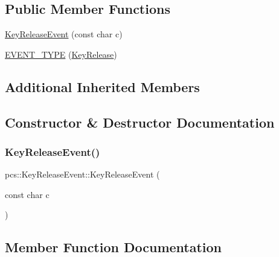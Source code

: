 \subsection*{Public Member Functions}
\begin{DoxyCompactItemize}
\item 
\hyperlink{classpcs_1_1KeyReleaseEvent_a03de553a1e75f029dea4f9d65760e707}{Key\+Release\+Event} (const char c)
\item 
\hyperlink{classpcs_1_1KeyReleaseEvent_aec9484a53a9b136d47cff458cd60bc91}{E\+V\+E\+N\+T\+\_\+\+T\+Y\+PE} (\hyperlink{namespacepcs_a12954f53e3d7d6a8765fd723e1ce8db4a17ee17cec34ff017c382ba1ce8dc4cdc}{Key\+Release})
\end{DoxyCompactItemize}
\subsection*{Additional Inherited Members}


\subsection{Constructor \& Destructor Documentation}
\mbox{\label{classpcs_1_1KeyReleaseEvent_a03de553a1e75f029dea4f9d65760e707}} 
\subsubsection{\texorpdfstring{Key\+Release\+Event()}{KeyReleaseEvent()}}
{\footnotesize\ttfamily pcs\+::\+Key\+Release\+Event\+::\+Key\+Release\+Event (\begin{DoxyParamCaption}\item[{const char}]{c }\end{DoxyParamCaption})\hspace{0.3cm}{\ttfamily [inline]}}



\subsection{Member Function Documentation}
\mbox{\label{classpcs_1_1KeyReleaseEvent_aec9484a53a9b136d47cff458cd60bc91}} 
